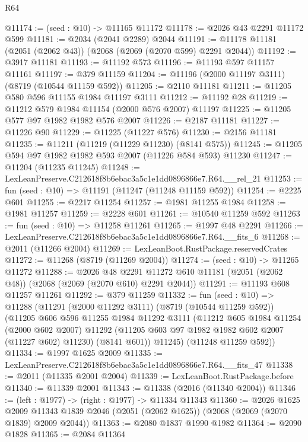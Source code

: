 \begin{lexlean}{R64}
\begin{coremodule}
@11174 := (seed : @10) -> @11165 @11172
@11178 := @2026 @43 @2291 @11172 @599
@11181 := @2034 (@2041 @2289) @2044
@11191 := @11178 @11181 (@2051 (@2062 @43)) (@2068 (@2069 (@2070 @599) @2291 @2044))
@11192 := @3917 @11181
@11193 := @11192 @573
@11196 := @11193 @597 @11157 @11161
@11197 := @379 @11159
@11204 := @11196 (@2000 @11197 @3111) (@8719 (@10544 @11159 @592))
@11205 := @2110 @11181
@11211 := @11205 @580 @596 @11155 @1984 @11197 @3111
@11212 := @11192 @28
@11219 := @11212 @579 @1984 @11154 (@2000 @576 @2007) @11197
@11225 := @11205 @577 @97 @1982 @1982 @576 @2007
@11226 := @2187 @11181
@11227 := @11226 @90
@11229 := @11225 (@11227 @576)
@11230 := @2156 @11181
@11235 := @11211 (@11219 (@11229 @11230) (@8141 @575))
@11245 := @11205 @594 @97 @1982 @1982 @593 @2007 (@11226 @584 @593) @11230
@11247 := @11204 (@11235 @11245)
@11248 := LexLeanPreserve.C212618f8b6ebac3a5c1e1dd0896866e7.R64.__rel_21
@11253 := fun (seed : @10) => @11191 (@11247 (@11248 @11159 @592))
@11254 := @2225 @601
@11255 := @2217 @11254
@11257 := @1981 @11255 @1984
@11258 := @1981 @11257
@11259 := @2228 @601
@11261 := @10540 @11259 @592
@11263 := fun (seed : @10) => @11258 @11261
@11265 := @1997 @48 @2291
@11266 := LexLeanPreserve.C212618f8b6ebac3a5c1e1dd0896866e7.R64.__fits_6
@11268 := @2011 (@11266 @2004)
@11269 := LexLeanBoot.RustPackage.reservedCrates
@11272 := @11268 (@8719 (@11269 @2004))
@11274 := (seed : @10) -> @11265 @11272
@11288 := @2026
    @48
    @2291
    @11272
    @610
    @11181
    (@2051 (@2062 @48))
    (@2068 (@2069 (@2070 @610) @2291 @2044))
@11291 := @11193 @608 @11257 @11261
@11292 := @379 @11259
@11332 := fun (seed : @10) =>
  @11288
    (@11291
      (@2000 @11292 @3111)
      (@8719 (@10544 @11259 @592))
      (@11205
        @606
        @596
        @11255
        @1984
        @11292
        @3111
        (@11212
          @605
          @1984
          @11254
          (@2000 @602 @2007)
          @11292
          (@11205 @603 @97 @1982 @1982 @602 @2007 (@11227 @602) @11230)
          (@8141 @601))
        @11245)
      (@11248 @11259 @592))
@11334 := @1997 @1625 @2009
@11335 := LexLeanPreserve.C212618f8b6ebac3a5c1e1dd0896866e7.R64.__fits_47
@11338 := @2011 (@11335 @2001 @2004)
@11339 := LexLeanBoot.RustPackage.before
@11340 := @11339 @2001
@11343 := @11338 (@2016 (@11340 @2004))
@11346 := (left : @1977) -> (right : @1977) -> @11334 @11343
@11360 := @2026
    @1625
    @2009
    @11343
    @1839
    @2046
    (@2051 (@2062 @1625))
    (@2068 (@2069 (@2070 @1839) @2009 @2044))
@11363 := @2080 @1837 @1990 @1982
@11364 := @2090 @1828
@11365 := @2084 @11364

\end{coremodule}
\end{lexlean}
